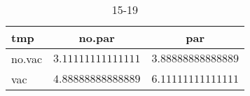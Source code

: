 %
\begin{table}[!tbp]
\caption{15-19\label{15-19}} 
\begin{center}
\begin{tabular}{lrr}
\hline\hline
\multicolumn{1}{l}{tmp}&\multicolumn{1}{c}{no.par}&\multicolumn{1}{c}{par}\tabularnewline
\hline
no.vac&$3.11111111111111$&$3.88888888888889$\tabularnewline
vac&$4.88888888888889$&$6.11111111111111$\tabularnewline
\hline
\end{tabular}
\end{center}
\end{table}

